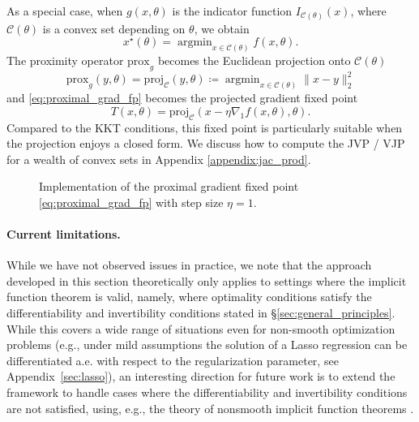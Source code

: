 \documentclass{article}
\def\cC{{\mathcal{C}}}
\def\prox{{\text{prox}}}
\def\proj{{\text{proj}}}
\DeclareMathOperator*{\argmin}{argmin}
\begin{document}
As a special case,
when $g(x, \theta)$ is the indicator function $I_{\cC(\theta)}(x)$,
where $\cC(\theta)$ is a convex set depending on $\theta$, we obtain
\begin{equation}
x^\star(\theta) = \argmin_{x \in \cC(\theta)} f(x, \theta).
\label{eq:constrained_pb}
\end{equation}
The proximity operator $\prox_g$ becomes the Euclidean projection onto
$\cC(\theta)$
\begin{equation}
\prox_g(y, \theta) =
\proj_{\cC}(y, \theta) \coloneqq
\argmin_{x \in \cC(\theta)} \|x - y \|^2_2
\label{eq:projection}
\end{equation}
and \eqref{eq:proximal_grad_fp} becomes the projected gradient fixed point
\begin{equation}
T(x, \theta) = \proj_{\cC}(x - \eta \nabla_1 f(x, \theta), \theta).
\label{eq:proj_grad_fp}
\end{equation}
Compared to the KKT conditions,
this fixed point is particularly suitable when the
projection enjoys a closed form.
We discuss how to compute the JVP / VJP for a wealth of convex sets in Appendix
\ref{appendix:jac_prod}. 

\begin{figure}[t]
\centering
{}
\caption{Implementation of the proximal gradient fixed point 
\eqref{eq:proximal_grad_fp} with step size $\eta=1$.}
\label{fig:pg_fixed_point}
\end{figure}

\paragraph{Current limitations.}

While we have not observed issues in practice, we note that the approach
developed in this section theoretically only applies to settings where
the implicit function theorem is valid, namely, where optimality conditions
satisfy the differentiability and invertibility conditions stated in
\S\ref{sec:general_principles}. While this covers a wide
range of situations even for non-smooth optimization problems (e.g., under mild assumptions the
solution of a Lasso regression can be differentiated a.e. with respect to the
regularization parameter, see Appendix~\ref{sec:lasso}), an interesting direction for future work is to extend
the framework to handle cases where the differentiability and invertibility
conditions are not satisfied, using, e.g., the theory of nonsmooth implicit
function theorems \cite{Clarke1983Optimization,Bolte2021Nonsmooth}.
\end{document}
